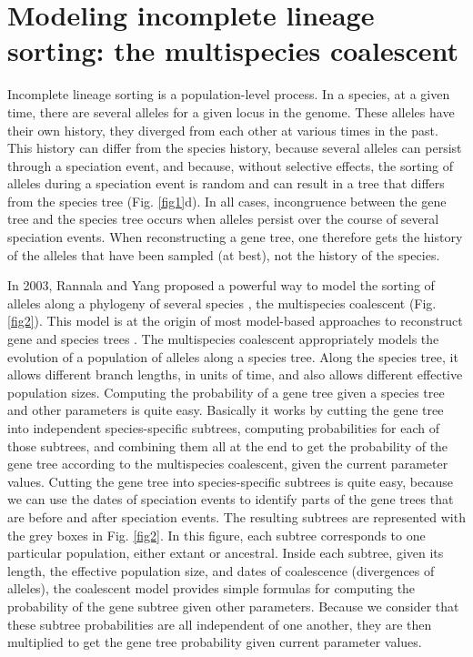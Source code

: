 \section{Modeling incomplete lineage sorting: the multispecies coalescent}
Incomplete lineage sorting is a population-level process.
In a species, at a given time, there are several alleles for a given locus in the genome.
These alleles have their own history, they diverged from each other at various times in the past.
This history can differ from the species history, because several alleles can persist through a speciation event, and because, without selective effects, the sorting of alleles during a speciation event is random and can result in a tree that differs from the species tree (Fig. \ref{fig1}d).
In all cases, incongruence between the gene tree and the species tree occurs when alleles persist over the course of several speciation events.
When reconstructing a gene tree, one therefore gets the history of the alleles that have been sampled (at best), not the history of the species. 

In 2003, Rannala and Yang proposed a powerful way to model the sorting of alleles along a phylogeny of several species \citep{Rannala2003}, the multispecies coalescent (Fig. \ref{fig2}).
This model is at the origin of most model-based approaches to reconstruct gene and species trees \citep{Edwards2007,Heled2010}.
The multispecies coalescent appropriately models the evolution of a population of alleles along a species tree.
Along the species tree, it allows different branch lengths, in units of time, and also allows different effective population sizes.
Computing the probability of a gene tree given a species tree and other parameters is quite easy.
Basically it works by cutting the gene tree into independent species-specific subtrees, computing probabilities for each of those subtrees, and combining them all at the end to get the probability of the gene tree according to the multispecies coalescent, given the current parameter values.
Cutting the gene tree into species-specific subtrees is quite easy, because we can use the dates of speciation events to identify parts of the gene trees that are before and after speciation events. 
The resulting subtrees are represented with the grey boxes in Fig. \ref{fig2}.
In this figure, each subtree corresponds to one particular population, either extant or ancestral.
Inside each subtree, given its length, the effective population size, and dates of coalescence (divergences of alleles), the coalescent model provides simple formulas for computing the probability of the gene subtree given other parameters.
Because we consider that these subtree probabilities are all independent of one another, they are then multiplied to get the gene tree probability given current parameter values.
 
